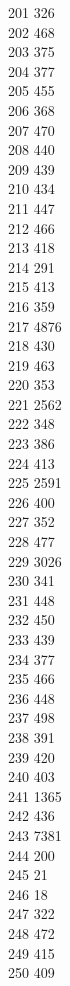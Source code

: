 { 201	326 \\
 202	468 \\
 203	375 \\
 204	377 \\
 205	455 \\
 206	368 \\
 207	470 \\
 208	440 \\
 209	439 \\
 210	434 \\
 211	447 \\
 212	466 \\
 213	418 \\
 214	291 \\
 215	413 \\
 216	359 \\
 217	4876 \\
 218	430 \\
 219	463 \\
 220	353 \\
 221	2562 \\
 222	348 \\
 223	386 \\
 224	413 \\
 225	2591 \\
 226	400 \\
 227	352 \\
 228	477 \\
 229	3026 \\
 230	341 \\
 231	448 \\
 232	450 \\
 233	439 \\
 234	377 \\
 235	466 \\
 236	448 \\
 237	498 \\
 238	391 \\
 239	420 \\
 240	403 \\
 241	1365 \\
 242	436 \\
 243	7381 \\
 244	200 \\
 245	21 \\
 246	18 \\
 247	322 \\
 248	472 \\
 249	415 \\
 250	409 \\
}
